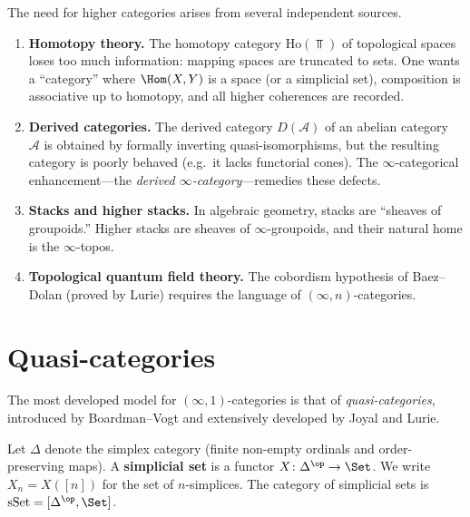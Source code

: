 
The need for higher categories arises from several independent sources.

\begin{enumerate}[label=(\roman*)]
\item \textbf{Homotopy theory.}
The homotopy category $\mathrm{Ho}(\Top)$ of topological spaces
loses too much information: mapping spaces are truncated to sets.
One wants a ``category'' where $\Hom(X,Y)$ is a space (or a
simplicial set), composition is associative up to homotopy, and
all higher coherences are recorded.

\item \textbf{Derived categories.}
The derived category $D(\mathcal{A})$ of an abelian category~$\mathcal{A}$
is obtained by formally inverting quasi-isomorphisms, but
the resulting category is poorly behaved (e.g.\ it lacks functorial
cones).  The $\infty$-categorical enhancement---the
\emph{derived $\infty$-category}---remedies these defects.

\item \textbf{Stacks and higher stacks.}
In algebraic geometry, stacks are ``sheaves of groupoids.''
Higher stacks are sheaves of $\infty$-groupoids, and their natural
home is the $\infty$-topos.

\item \textbf{Topological quantum field theory.}
The cobordism hypothesis of Baez--Dolan (proved by Lurie) requires
the language of $(\infty,n)$-categories.
\end{enumerate}


\section{Quasi-categories}\label{sec:quasi-categories}


The most developed model for $(\infty,1)$-categories is that of
\emph{quasi-categories}, introduced by Boardman--Vogt and extensively
developed by Joyal and Lurie.

\begin{definition}\label{def:simplicial-set-reminder}
Let $\Delta$ denote the simplex category (finite non-empty ordinals and
order-preserving maps).  A \textbf{simplicial set} is a functor
$X\colon\Delta^{\op}\to\Set$.  We write $X_n = X([n])$ for the set of
$n$-simplices.  The category of simplicial sets is
$\mathrm{sSet} = [\Delta^{\op}, \Set]$.
\end{definition}

